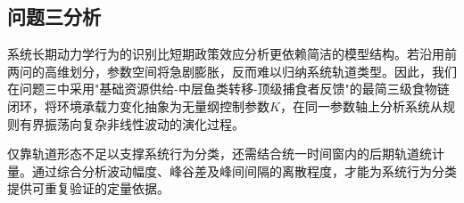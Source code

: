 \subsection{问题三分析}
系统长期动力学行为的识别比短期政策效应分析更依赖简洁的模型结构。若沿用前两问的高维划分，参数空间将急剧膨胀，反而难以归纳系统轨道类型。因此，我们在问题三中采用"基础资源供给-中层鱼类转移-顶级捕食者反馈"的最简三级食物链闭环，将环境承载力变化抽象为无量纲控制参数$K$，在同一参数轴上分析系统从规则有界振荡向复杂非线性波动的演化过程。

仅靠轨道形态不足以支撑系统行为分类，还需结合统一时间窗内的后期轨道统计量。通过综合分析波动幅度、峰谷差及峰间间隔的离散程度，才能为系统行为分类提供可重复验证的定量依据。

